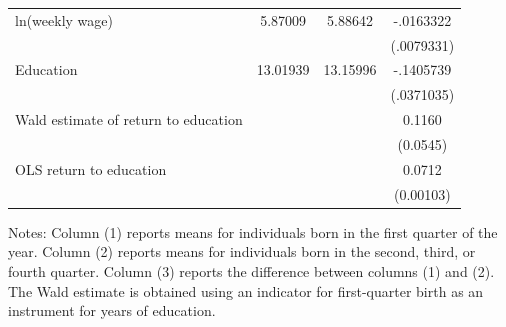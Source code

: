 \documentclass[11pt]{article}
\begin{document}
\begin{table}[htbp]
\begin{tabular}{lccc}
ln(weekly wage)
&  5.87009
&  5.88642
&  -.0163322 \\
& & & (.0079331) \\[0.6em]

Education
&  13.01939
&  13.15996
&   -.1405739 \\
& & & (.0371035) \\[0.6em]

Wald estimate of return to education
& & & 0.1160 \\
& & & (0.0545) \\[0.6em]

OLS return to education
& & & 0.0712 \\
& & & (0.00103) \\

\bottomrule
\end{tabular}

\begin{flushleft}
\footnotesize
Notes: Column (1) reports means for individuals born in the first quarter of the year. 
Column (2) reports means for individuals born in the second, third, or fourth quarter. 
Column (3) reports the difference between columns (1) and (2). 
The Wald estimate is obtained using an indicator for first-quarter birth as an instrument for years of education.
\end{flushleft}

\end{table}
\end{document}
